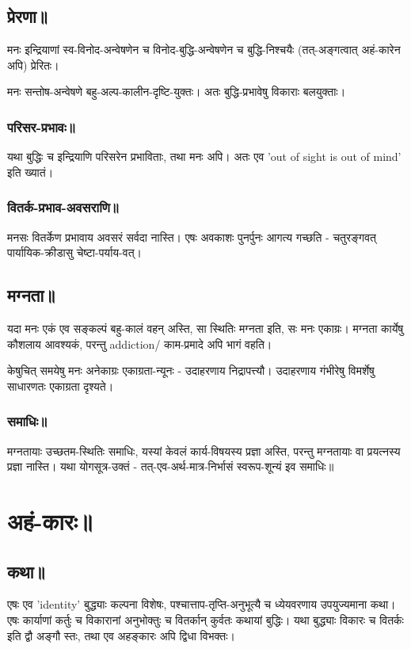 \documentclass[oneside, article]{memoir}
\begin{document}
\section{प्रेरणा॥}
मनः इन्द्रियाणां स्व-विनोद-अन्वेषणेन च विनोद-बुद्धि-अन्वेषणेन च बुद्धि-निश्चयैः (तत्-अङ्गत्वात् अहं-कारेन अपि) प्रेरितः।

मनः सन्तोष-अन्वेषणे बहु-अल्प-कालीन-दृष्टि-युक्तः। अतः बुद्धि-प्रभावेषु विकाराः बलयुक्ताः।

\subsection{परिसर-प्रभावः॥}
यथा बुद्धिः च इन्द्रियाणि परिसरेन प्रभाविताः, तथा मनः अपि। अतः एव 'out of sight is out of mind' इति ख्यातं।

\subsection{वितर्क-प्रभाव-अवसराणि॥}
मनसः वितर्केण प्रभावाय अवसरं सर्वदा नास्ति। एषः‌ अवकाशः पुनर्पुनः आगत्य गच्छति - चतुरङ्गवत् पार्यायिक-क्रीडासु चेष्टा-पर्याय-वत्।

\section{मग्नता॥}
यदा मनः एकं एव सङ्कल्पं बहु-कालं वहन् अस्ति, सा स्थितिः मग्नता इति, सः मनः एकाग्रः। मग्नता कार्येषु कौशलाय आवश्यकं, परन्तु addiction/ काम-प्रमादे अपि भागं वहति।

केषुचित् समयेषु मनः अनेकाग्रः एकाग्रता-न्यूनः - उदाहरणाय निद्रापत्त्यौ। उदाहरणाय गंभीरेषु विमर्शेषु साधारणतः एकाग्रता दृश्यते।

\subsection{समाधिः॥}
मग्नतायाः उच्छतम-स्थितिः समाधिः, यस्यां केवलं कार्य-विषयस्य प्रज्ञा अस्ति, परन्तु मग्नतायाः वा प्रयत्नस्य प्रज्ञा नास्ति। यथा योगसूत्र-उक्तं - तत्-एव-अर्थ-मात्र-निर्भासं स्वरूप-शून्यं इव समाधिः॥

\chapter{अहं-कारः॥}
\section{कथा॥}
एषः एव 'identity' बुद्ध्याः कल्पना विशेषः, पश्चात्ताप-तृप्ति-अनुभूत्यै च ध्येयवरणाय उपयुज्यमाना कथा। एषः कार्याणां कर्तुः च विकारानां अनुभोक्तुः च वितर्कान् कुर्वतः कथायां बुद्धिः। यथा बुद्ध्याः विकारः च वितर्कः इति द्वौ अङ्गौ स्तः, तथा एव अहङ्कारः अपि द्विधा विभक्तः।
\end{document}
